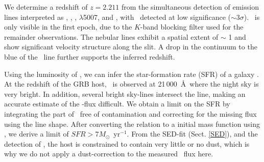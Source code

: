 \documentclass{aa}    %
\begin{document}
We determine a redshift of $z = 2.211$ from the simultaneous detection of
emission lines interpreted as \lya, \oii, \hb, \oiii$\lambda$5007, and \ha, with
\hb~detected at low significance ($\sim 3 \sigma$). \ha~is only visible in the
first epoch, due to the $K$-band blocking filter used for the remainder
observations. The nebular lines exhibit a spatial extent of $\sim$ 1 and
show significant velocity structure along the slit. A drop in the continuum to
the blue of the \lya~line further supports the inferred redshift.




Using the luminosity of \ha, we can infer the star-formation rate (SFR) of a 
galaxy \citep{Kennicutt1998}. At the redshift of the GRB host, \ha~is observed at 
21\,000~\AA~where the night sky is very bright. In addition, several bright sky-lines 
intersect the line, making an accurate estimate of the \ha-flux difficult. 
We obtain a limit on the SFR by integrating the part of \ha~free of contamination and 
correcting for the missing flux using the line shape. After converting the 
\citet{Kennicutt1998} relation to a \citet{Chabrier2003} initial mass function using
\citet{Madau2014}, we derive a limit of $SFR > 7 M_\odot$~yr$^{-1}$. 
From the SED-fit (Sect. \ref{SED}), and the detection of \lya, the host is
constrained to contain very little or no dust, which is why we do not apply 
a dust-correction to the measured \ha~flux here.

\end{document}
